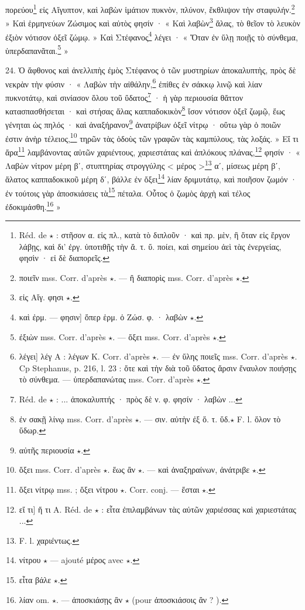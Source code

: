 \documentclass[landscape, a4paper, 11pt, oneside, polutonikogreek, french]{article}
\begin{document}
πορεύου\footnote{Réd. de $\star$ : στῆσον α. εἰς πλ., κατὰ τὸ διπλοῦν · καὶ πρ. μὲν, ἢ ὅταν εἰς ἕργον λάβῃς, καὶ δι' ἐργ. ὑποτιθῇς τὴν ἄ. τ. ὕ. ποίει, καὶ σημείου ἀεὶ τὰς ἐνεργείας, φησὶν · εἰ δὲ διαπορεῖς.} εἰς Αἴγυπτον, καὶ λαβὼν ἱμάτιον πυκνὸν, πλύνον, ἔκθλιψον τὴν σταφυλήν.\footnote{ποιεῖν mss. Corr. d'après $\star$. --- ἢ διαπορὶς mss. Corr. d'après $\star$.} » Καὶ ἑρμηνεύων Ζώσιμος καὶ αὐτὸς φησίν · « Καὶ λαβὼν\footnote{εἰς Αἴγ. φησι $\star$.} ἅλας, τὸ θεῖον τὸ λευκὸν ἐξιὸν νότισον ὀξεῖ ζώμῳ. » Καὶ Στέφανος\footnote{καὶ ἐρμ. --- φησιν] ὅπερ ἑρμ. ὁ Ζώσ. φ. · λαβὼν $\star$.} λέγει · « Ὅταν ἐν ὕλῃ ποιῇς τὸ σύνθεμα, ὑπερδαπανᾶται.\footnote{ἐξιὼν mss. Corr. d'après $\star$. --- ὄξει mss. Corr. d'après $\star$.} »

24. Ὁ ἄφθονος καὶ ἀνελλιπὴς ἐμὸς Στέφανος ὁ τῶν μυστηρίων ἀποκαλυπτὴς, πρὸς δὲ νεκρὰν τὴν φύσιν · « Λαβὼν τὴν αἰθάλην,\footnote{λέγει] λέγ A : λέγων K. Corr. d'après $\star$. --- ἐν ὕλης ποιεῖς mss. Corr. d'après $\star$. Cp Stephanus, p. 216, l. 23 : ὅτε καὶ τὴν διὰ τοῦ ὕδατος ἄρσιν ἔναυλον ποιήσῃς τὸ σύνθεμα. --- ὑπερδαπανώτας mss. Corr. d'après $\star$.} ἐπίθες ἐν σάκκῳ λινῷ καὶ λίαν πυκνοτάτῳ, καὶ σινίασον ὅλου τοῦ ὕδατος\footnote{Réd. de $\star$ : ... ἀποκαλυπτής · πρὸς δὲ ν. φ. φησίν · λαβὼν ...} · ἡ γὰρ περιουσία θἄττον κατασπασθήσεται · καὶ στήσας ἅλας καππαδοκικὸν\footnote{ἐν σακῇ λίνῳ mss. Corr. d'après $\star$. --- σιν. αὐτὴν ἐξ ὅ. τ. ὕδ.$\star$ F. l. ὅλον τὸ ὕδωρ.} ἴσον νότισον ὀξεῖ ζωμῷ, ἕως γένηται ὡς πηλός · καὶ ἀναξήρανον\footnote{αὐτῆς περιουσία $\star$.} ἀνατρίβων ὀξεῖ νίτρῳ · οὕτω γὰρ ὁ ποιῶν ἐστιν ἀνὴρ τέλειος,\footnote{ὄξει mss. Corr. d'après $\star$. ἕως ἂν $\star$. --- καὶ ἀναξηραίνων, ἀνάτριβε $\star$.} τηρῶν τὰς ὁδοὺς τῶν γραφῶν τὰς καμπύλους, τὰς λοξάς. » Εἴ τι ἄρα\footnote{ὄξει νίτρῳ mss. ; ὄξει νίτρου $\star$. Corr. conj. --- ἔσται $\star$.} λαμβάνοντας αὐτῶν χαριέντους, χαριεστάτας καὶ ἀπλόκους πλάνας,\footnote{εἴ τι] ἥ τι A. Réd. de $\star$ : εἶτα ἐπιλαμβάνων τὰς αὐτῶν χαριέσσας καὶ χαριεστάτας ...} φησίν · « Λαβὼν νίτρον μέρη βʹ, στυπτηρίας στρογγύλης < μέρος >\footnote{F. l. χαριέντως.} αʹ, μίσεως μέρη βʹ, ἅλατος καππαδοκικοῦ μέρη δʹ, βάλλε ἐν ὄξει\footnote{νίτρου $\star$ --- ajouté μέρος avec $\star$.} λίαν δριμυτάτῳ, καὶ ποιῆσον ζωμόν · ἐν τούτοις γὰρ ἀποσκιάσεις τὰ\footnote{εἶτα βάλε $\star$.} πέταλα. Οὗτος ὁ ζωμὸς ἀρχὴ καὶ τέλος ἐδοκιμάσθη.\footnote{λίαν om. $\star$. --- ἀποσκιάσῃς ἂν $\star$ (pour ἀποσκιάσοις ἂν ? ).} »

\bigskip
\centerline{\EightStarTaper}
\centerline{\EightStarTaper\EightStarTaper}
\bigskip
\end{document}
